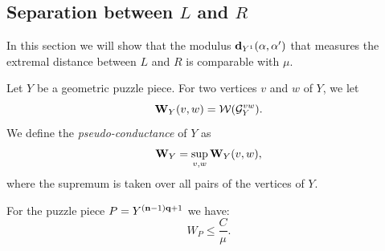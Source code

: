 \subsection{Separation between $L$ and $R$}

   In this section we will show that   the modulus ${\mathbf{d}}_{Y^1}(\alpha, \alpha')$
that measures  the extremal distance between $L$ and $R$ is comparable
with $\mu$.

Let $Y$ be a geometric puzzle piece.  For  two vertices $v$ and $w$ of $Y$,
 we let
$$
 {\mathbf{W}}_Y(v,w) ={\mathcal W}({\mathcal G}_Y^{vw}).
$$
We define the {\it pseudo-conductance} of $Y$ as
$$
    {\mathbf{W}}_Y =\sup_{v,w} {\mathbf{W}}_Y(v,w),
$$
where the supremum is taken over all pairs of the vertices of $Y$.

\begin{lem}
  For the puzzle piece $P=Y^{({\mathbf{n}}-1){\mathbf{q}}+1}$ we have:
   $$   W_P\leq \frac{C} {\mu}. $$
\end{lem}

